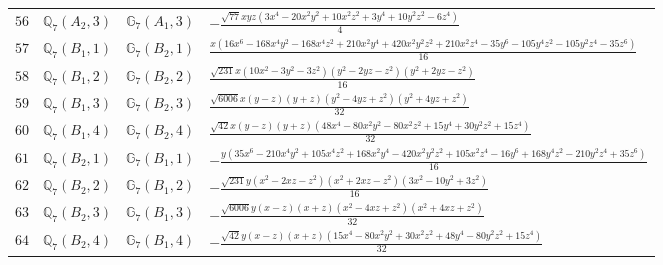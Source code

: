 \documentclass[fleqn,8pt,landscape]{jsarticle}
\begin{document}
\begin{table}[ht!]
\begin{center}
\begin{tabular}{cccl}
$ 56 $ & $ \mathbb{Q}_{7}(A_{2},3) $ & $ \mathbb{G}_{7}(A_{1},3) $ & $ - \frac{\sqrt{77} x y z \left(3 x^{4} - 20 x^{2} y^{2} + 10 x^{2} z^{2} + 3 y^{4} + 10 y^{2} z^{2} - 6 z^{4}\right)}{4} $ \\
$ 57 $ & $ \mathbb{Q}_{7}(B_{1},1) $ & $ \mathbb{G}_{7}(B_{2},1) $ & $ \frac{x \left(16 x^{6} - 168 x^{4} y^{2} - 168 x^{4} z^{2} + 210 x^{2} y^{4} + 420 x^{2} y^{2} z^{2} + 210 x^{2} z^{4} - 35 y^{6} - 105 y^{4} z^{2} - 105 y^{2} z^{4} - 35 z^{6}\right)}{16} $ \\
$ 58 $ & $ \mathbb{Q}_{7}(B_{1},2) $ & $ \mathbb{G}_{7}(B_{2},2) $ & $ \frac{\sqrt{231} x \left(10 x^{2} - 3 y^{2} - 3 z^{2}\right) \left(y^{2} - 2 y z - z^{2}\right) \left(y^{2} + 2 y z - z^{2}\right)}{16} $ \\
$ 59 $ & $ \mathbb{Q}_{7}(B_{1},3) $ & $ \mathbb{G}_{7}(B_{2},3) $ & $ \frac{\sqrt{6006} x \left(y - z\right) \left(y + z\right) \left(y^{2} - 4 y z + z^{2}\right) \left(y^{2} + 4 y z + z^{2}\right)}{32} $ \\
$ 60 $ & $ \mathbb{Q}_{7}(B_{1},4) $ & $ \mathbb{G}_{7}(B_{2},4) $ & $ \frac{\sqrt{42} x \left(y - z\right) \left(y + z\right) \left(48 x^{4} - 80 x^{2} y^{2} - 80 x^{2} z^{2} + 15 y^{4} + 30 y^{2} z^{2} + 15 z^{4}\right)}{32} $ \\
$ 61 $ & $ \mathbb{Q}_{7}(B_{2},1) $ & $ \mathbb{G}_{7}(B_{1},1) $ & $ - \frac{y \left(35 x^{6} - 210 x^{4} y^{2} + 105 x^{4} z^{2} + 168 x^{2} y^{4} - 420 x^{2} y^{2} z^{2} + 105 x^{2} z^{4} - 16 y^{6} + 168 y^{4} z^{2} - 210 y^{2} z^{4} + 35 z^{6}\right)}{16} $ \\
$ 62 $ & $ \mathbb{Q}_{7}(B_{2},2) $ & $ \mathbb{G}_{7}(B_{1},2) $ & $ - \frac{\sqrt{231} y \left(x^{2} - 2 x z - z^{2}\right) \left(x^{2} + 2 x z - z^{2}\right) \left(3 x^{2} - 10 y^{2} + 3 z^{2}\right)}{16} $ \\
$ 63 $ & $ \mathbb{Q}_{7}(B_{2},3) $ & $ \mathbb{G}_{7}(B_{1},3) $ & $ - \frac{\sqrt{6006} y \left(x - z\right) \left(x + z\right) \left(x^{2} - 4 x z + z^{2}\right) \left(x^{2} + 4 x z + z^{2}\right)}{32} $ \\
$ 64 $ & $ \mathbb{Q}_{7}(B_{2},4) $ & $ \mathbb{G}_{7}(B_{1},4) $ & $ - \frac{\sqrt{42} y \left(x - z\right) \left(x + z\right) \left(15 x^{4} - 80 x^{2} y^{2} + 30 x^{2} z^{2} + 48 y^{4} - 80 y^{2} z^{2} + 15 z^{4}\right)}{32} $ \\
 \hline \hline
\end{tabular}
\end{center}
\end{table}
\end{document}
